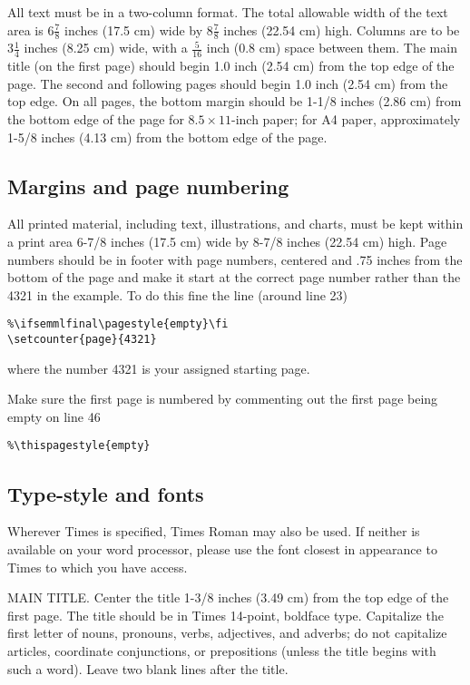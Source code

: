 \documentclass[10pt,twocolumn,letterpaper]{article}
\begin{document}
All text must be in a two-column format. The total allowable width of the
text area is $6\frac78$ inches (17.5 cm) wide by $8\frac78$ inches (22.54
cm) high. Columns are to be $3\frac14$ inches (8.25 cm) wide, with a
$\frac{5}{16}$ inch (0.8 cm) space between them. The main title (on the
first page) should begin 1.0 inch (2.54 cm) from the top edge of the
page. The second and following pages should begin 1.0 inch (2.54 cm) from
the top edge. On all pages, the bottom margin should be 1-1/8 inches (2.86
cm) from the bottom edge of the page for $8.5 \times 11$-inch paper; for A4
paper, approximately 1-5/8 inches (4.13 cm) from the bottom edge of the
page.

\subsection{Margins and page numbering}

All printed material, including text, illustrations, and charts, must be kept
within a print area 6-7/8 inches (17.5 cm) wide by 8-7/8 inches (22.54 cm)
high.
Page numbers should be in footer with page numbers, centered and .75
inches from the bottom of the page and make it start at the correct page
number rather than the 4321 in the example.  To do this fine the line (around
line 23)
\begin{verbatim}
%\ifsemmlfinal\pagestyle{empty}\fi
\setcounter{page}{4321}
\end{verbatim}
where the number 4321 is your assigned starting page.

Make sure the first page is numbered by commenting out the first page being
empty on line 46
\begin{verbatim}
%\thispagestyle{empty}
\end{verbatim}


\subsection{Type-style and fonts}

Wherever Times is specified, Times Roman may also be used. If neither is
available on your word processor, please use the font closest in
appearance to Times to which you have access.

MAIN TITLE. Center the title 1-3/8 inches (3.49 cm) from the top edge of
the first page. The title should be in Times 14-point, boldface type.
Capitalize the first letter of nouns, pronouns, verbs, adjectives, and
adverbs; do not capitalize articles, coordinate conjunctions, or
prepositions (unless the title begins with such a word). Leave two blank
lines after the title.
\end{document}
